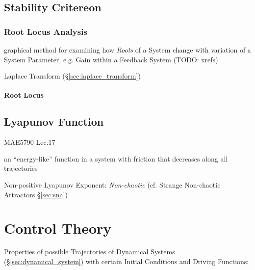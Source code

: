 \subsection{Stability Critereon}\label{sec:stability_critereon}

\subsubsection{Root Locus Analysis}\label{sec:root_locus_analysis}

graphical method for examining how \emph{Roots} of a System change with
variation of a System Parameter, e.g. Gain within a Feedback System (TODO:
xrefs)

Laplace Transform (\S\ref{sec:laplace_transform})



\paragraph{Root Locus}\label{sec:root_locus}\hfill



\subsection{Lyapunov Function}\label{sec:lyapunov_function}

MAE5790 Lec.17

an ``energy-like'' function in a system with friction that decreases along
all trajectories

Non-positive Lyapunov Exponent: \emph{Non-chaotic} (cf. Strange Non-chaotic
Attractors \S\ref{sec:sna})



\section{Control Theory}\label{sec:control_theory}

Properties of possible Trajectories of Dynamical Systems
(\S\ref{sec:dynamical_system}) with certain Initial Conditions and
Driving Functions:

